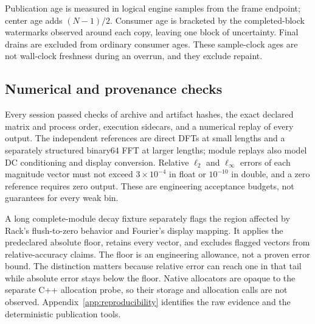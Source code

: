 Publication age is measured in logical engine samples from the frame
endpoint; center age adds $(N-1)/2$. Consumer age is bracketed by the
completed-block watermarks observed around each copy, leaving one block of
uncertainty. Final drains are excluded from ordinary consumer ages. These
sample-clock ages are not wall-clock freshness during an overrun, and they
exclude repaint.

\subsection{Numerical and provenance checks}
Every session passed checks of archive and artifact hashes, the exact
declared matrix and process order, execution sidecars, and a numerical replay
of every output. The independent references are direct DFTs at small lengths
and a separately structured binary64 FFT at larger lengths; module replays
also model DC conditioning and display conversion. Relative $\ell_2$ and
$\ell_\infty$ errors of each magnitude vector must not exceed
$3\times10^{-4}$ in float or $10^{-10}$ in double, and a zero reference
requires zero output. These are engineering acceptance budgets, not
guarantees for every weak bin.

A long complete-module decay fixture separately flags the region affected by
Rack's flush-to-zero behavior and Fourier's display mapping. It applies the
predeclared  absolute floor, retains every vector,
and excludes flagged vectors from relative-accuracy claims. The floor is an
engineering allowance, not a proven error bound. The distinction matters
because relative error can reach one in that tail while absolute error stays
below the floor. Native allocators are opaque to the separate C++ allocation
probe, so their storage and allocation calls are not observed.
Appendix~\ref{app:reproducibility} identifies the raw evidence and the
deterministic publication tools.
